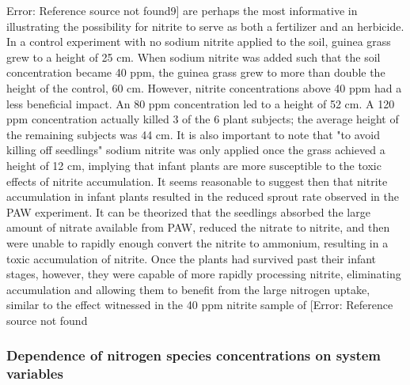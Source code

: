 Error: Reference source not found9] are perhaps the most informative in illustrating the possibility for nitrite to serve as both a fertilizer and an herbicide.    In a control experiment with no sodium nitrite applied to the soil, guinea grass grew to a height of 25 cm.  When sodium nitrite was added such that the soil concentration became 40 ppm, the guinea grass grew to more than double the height of the control, 60 cm.  However, nitrite concentrations above 40 ppm had a less beneficial impact.  An 80 ppm concentration led to a height of 52 cm.  A 120 ppm concentration actually killed 3 of the 6 plant subjects; the average height of the remaining subjects was 44 cm.  It is also important to note that "to avoid killing off seedlings" sodium nitrite was only applied once the grass achieved a height of 12 cm, implying that infant plants are more susceptible to the toxic effects of nitrite accumulation. \cite{zhou2011introduction} It seems reasonable to suggest then that nitrite accumulation in infant plants resulted in the reduced sprout rate observed in the PAW experiment.  It can be theorized that the seedlings absorbed the large amount of nitrate available from PAW, reduced the nitrate to nitrite, and then were unable to rapidly enough convert the nitrite to ammonium, resulting in a toxic accumulation of nitrite.  Once the plants had survived past their infant stages, however, they were capable of more rapidly processing nitrite, eliminating accumulation and allowing them to benefit from the large nitrogen uptake, similar to the effect witnessed in the 40 ppm nitrite sample of [Error: Reference source not found

\subsubsection{Dependence of nitrogen species concentrations on system variables}

